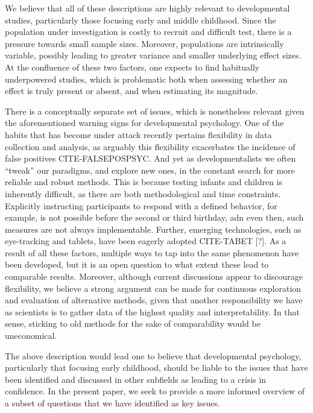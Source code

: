 \documentclass[english,floatsintext,man]{apa6}
\begin{document}
We believe that all of these descriptions are highly relevant to
developmental studies, particularly those focusing early and middle
childhood. Since the population under investigation is costly to recruit
and difficult test, there is a pressure towards small sample sizes.
Moreover, populations are intrinsically variable, possibly leading to
greater variance and smaller underlying effect sizes. At the confluence
of these two factors, one expects to find habitually underpowered
studies, which is problematic both when assessing whether an effect is
truly present or absent, and when estimating its magnitude.

There is a conceptually separate set of issues, which is nonetheless
relevant given the aforementioned warning signs for developmental
psychology. One of the habits that has become under attack recently
pertains flexibility in data collection and analysis, as arguably this
flexibility exacerbates the incidence of false positives
CITE-FALSEPOSPSYC. And yet as developmentalists we often \enquote{tweak}
our paradigms, and explore new ones, in the constant search for more
reliable and robust methods. This is because testing infants and
children is inherently difficult, as there are both methodological and
time constraints. Explicitly instructing participants to respond with a
defined behavior, for example, is not possible before the second or
third birthday, adn even then, such measures are not always
implementable. Further, emerging technologies, such as eye-tracking and
tablets, have been eagerly adopted CITE-TABET {[}?{]}. As a result of
all these factors, multiple ways to tap into the same phenomenon have
been developed, but it is an open question to what extent these lead to
comparable results. Moreover, although current discussions appear to
discourage flexibility, we believe a strong argument can be made for
continuous exploration and evaluation of alternative methods, given that
another responsibility we have as scientists is to gather data of the
highest quality and interpretability. In that sense, sticking to old
methods for the sake of comparability would be uneconomical.

The above description would lead one to believe that developmental
psychology, particularly that focusing early childhood, should be liable
to the issues that have been identified and discussed in other subfields
as leading to a crisis in confidence. In the present paper, we seek to
provide a more informed overview of a subset of questions that we have
identified as key issues.
\end{document}
